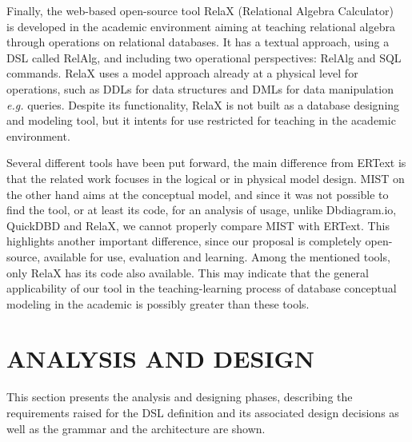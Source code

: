 \documentclass[a4paper,twoside,anonymous]{article}
\begin{document}
Finally, the web-based open-source tool RelaX (Relational Algebra Calculator)~\cite{Kessler:2019}
is developed in the academic environment aiming at teaching relational algebra through operations on relational databases.
It has a textual approach, using a DSL called RelAlg, and including two operational perspectives: RelAlg and SQL commands.
RelaX uses a model approach already at a physical level for operations, such as DDLs for data structures and DMLs for data manipulation \textit{e.g.} queries.
Despite its functionality, RelaX is not built as a database designing and modeling tool, but it intents for use restricted for teaching in the academic environment.

Several different tools have been put forward, the main difference from ERText is that the related work focuses in the logical or in physical model design. 
MIST on the other hand aims at the conceptual model, and since it was not possible to find the tool, or at least its code, for an analysis of usage, unlike Dbdiagram.io, QuickDBD and RelaX, we cannot properly compare MIST with ERText. 
This highlights another important difference, since our proposal is completely open-source, available for use, evaluation and learning. 
Among the mentioned tools, only RelaX has its code also available.
This may indicate that the general applicability of our tool in the teaching-learning process of database  conceptual modeling in the academic is possibly greater than these tools.

\section{\uppercase{Analysis and Design}}
\label{sec:analysisDesign}

This section presents the analysis and designing phases, describing the requirements raised for the DSL definition and its associated design decisions as well as the grammar and the architecture are shown.
\end{document}
